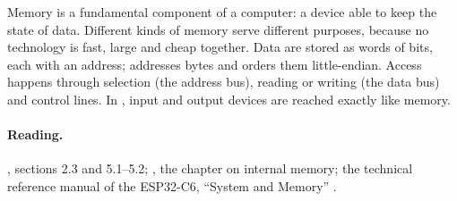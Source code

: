 Memory is a fundamental component of a computer: a device able to keep the
state of data. Different kinds of memory serve different purposes, because no
technology is fast, large and cheap together. Data are stored as words of
bits, each with an address; \riscv addresses bytes and orders them
little-endian. Access happens through selection (the address bus), reading or
writing (the data bus) and control lines. In \riscv, input and output devices
are reached exactly like memory.

\paragraph{Reading.} \citet{patterson2020}, sections 2.3 and 5.1--5.2;
\citet{stallings2021}, the chapter on internal memory; the technical reference
manual of the ESP32-C6, ``System and Memory'' \citep{esp32c6trm}.
